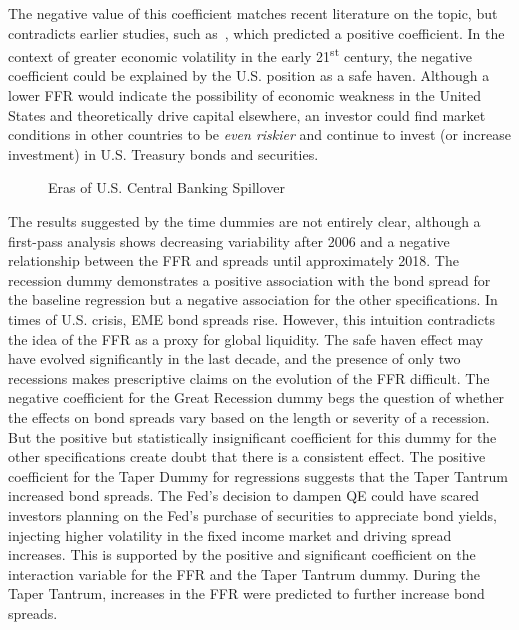 \documentclass[12pt]{article}
\begin{document}
The negative value of this coefficient matches recent literature on the topic, but contradicts earlier studies, such as~\textcite{arora01}, which predicted a positive coefficient. In the context of greater economic volatility in the early 21\textsuperscript{st} century, the negative coefficient could be explained by the U.S. position as a safe haven. Although a lower FFR would indicate the possibility of economic weakness in the United States and theoretically drive capital elsewhere, an investor could find market conditions in other countries to be \textit{even riskier} and continue to invest (or increase investment) in U.S. Treasury bonds and securities.
\begin{figure}[h!]
	\caption{Eras of U.S. Central Banking Spillover}
	\centering
	\label{fig:time}
\end{figure}

The results suggested by the time dummies are not entirely clear, although a first-pass analysis shows decreasing variability after 2006 and a negative relationship between the FFR and spreads until approximately 2018. The recession dummy demonstrates a positive association with the bond spread for the baseline regression but a negative association for the other specifications. In times of U.S. crisis, EME bond spreads rise. However, this intuition contradicts the idea of the FFR as a proxy for global liquidity. The safe haven effect may have evolved significantly in the last decade, and the presence of only two recessions makes prescriptive claims on the evolution of the FFR difficult. The negative coefficient for the Great Recession dummy begs the question of whether the effects on bond spreads vary based on the length or severity of a recession. But the positive but statistically insignificant coefficient for this dummy for the other specifications create doubt that there is a consistent effect. The positive coefficient for the Taper Dummy for regressions suggests that the Taper Tantrum increased bond spreads. The Fed's decision to dampen QE could have scared investors planning on the Fed's purchase of securities to appreciate bond yields, injecting higher volatility in the fixed income market and driving spread increases. This is supported by the positive and significant coefficient on the interaction variable for the FFR and the Taper Tantrum dummy. During the Taper Tantrum, increases in the FFR were predicted to further increase bond spreads.
\end{document}
